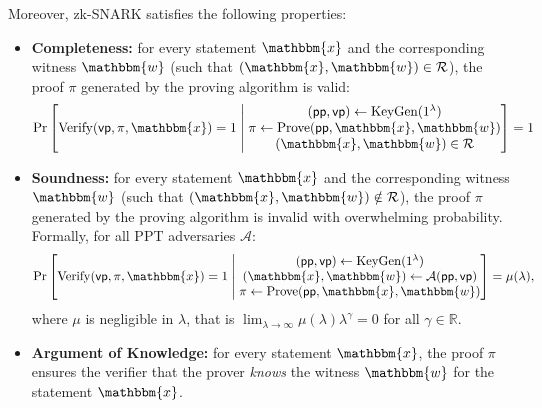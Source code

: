 \documentclass{iacrtrans}
\begin{document}
\begin{definition}
    Moreover, zk-SNARK satisfies the following properties:
    \begin{itemize}
        \item \textbf{Completeness:} for every statement $\mathbbm{x}$ and the
        corresponding witness $\mathbbm{w}$ (such that $(\mathbbm{x},
        \mathbbm{w}) \in \mathcal{R}$), the proof $\pi$ generated by the proving
        algorithm is valid:
        \begin{equation*}
            \text{Pr}\left[ \mathrm{Verify}(\mathsf{vp}, \pi, \mathbbm{x})=1 \;\middle|\; 
            \begin{matrix}
                (\mathsf{pp}, \mathsf{vp}) \gets \mathrm{KeyGen}(1^{\lambda}) \\
                \pi \gets \mathrm{Prove}(\mathsf{pp}, \mathbbm{x}, \mathbbm{w}) \\
                (\mathbbm{x}, \mathbbm{w}) \in \mathcal{R}
            \end{matrix}
            \right] = 1
        \end{equation*}
        \item \textbf{Soundness:} for every statement $\mathbbm{x}$ and the
        corresponding witness $\mathbbm{w}$ (such that $(\mathbbm{x},
        \mathbbm{w}) \notin \mathcal{R}$), the proof $\pi$ generated by the
        proving algorithm is invalid with overwhelming probability. Formally, 
        for all PPT adversaries $\mathcal{A}$:
        \begin{equation*}
            \text{Pr}\left[ \mathrm{Verify}(\mathsf{vp}, \pi, \mathbbm{x})=1 \;\middle|\; 
            \begin{matrix}
                (\mathsf{pp}, \mathsf{vp}) \gets \mathrm{KeyGen}(1^{\lambda}) \\
                (\mathbbm{x}, \mathbbm{w}) \gets \mathcal{A}(\mathsf{pp}, \mathsf{vp}) \\
                \pi \gets \mathrm{Prove}(\mathsf{pp}, \mathbbm{x}, \mathbbm{w})
            \end{matrix}
            \right] = \mu(\lambda),
        \end{equation*}
        where $\mu$ is negligible in $\lambda$, that is $\lim_{\lambda \to
        \infty}\mu(\lambda)\lambda^{\gamma}=0$ for all $\gamma \in \mathbb{R}$.
        \item \textbf{Argument of Knowledge:} for every statement $\mathbbm{x}$,
        the proof $\pi$ ensures the verifier that the prover \textit{knows} the
        witness $\mathbbm{w}$ for the statement $\mathbbm{x}$.

\end{itemize}
\end{definition}
\end{document}
